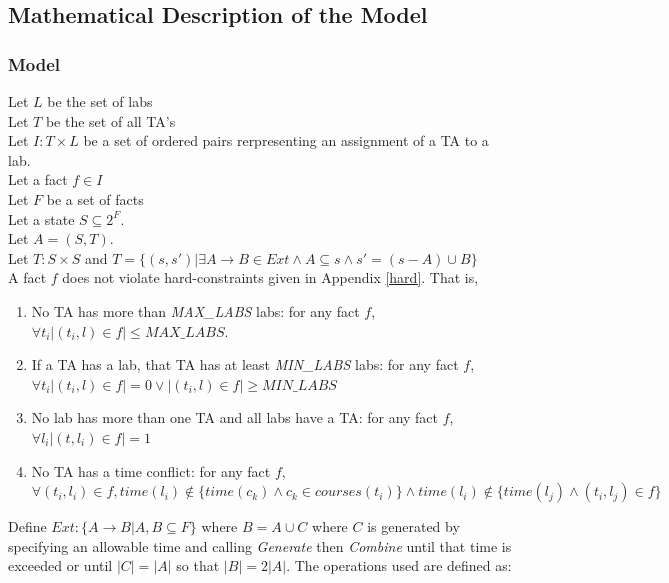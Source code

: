 \documentclass{article}
\begin{document}
\subsection{Mathematical Description of the Model}

\subsubsection{Model}

Let $L$ be the set of labs\\

Let $T$ be the set of all TA's\\

Let $I : T \times L$ be a set of ordered pairs rerpresenting an
assignment of a TA to a lab.\\

Let a fact $f \in I$\\

Let $F$ be a set of facts\\

Let a state $S \subseteq 2^F$.\\

Let $A = (S, T)$.\\

Let $T: S \times S$ and $T = \{ (s,s')| \exists A \to B \in Ext \land A
\subseteq s \land s' =(s-A) \cup B \}$ \\

A fact $f$ does not violate hard-constraints given in Appendix \ref{hard}. That is,
\begin{enumerate}
\item No TA has more than \textit{MAX\_LABS} labs: for any fact $f$, $\forall t_i |(t_i,l)\in f|\le MAX\_LABS$.
\item If a TA has a lab, that TA has at least \textit{MIN\_LABS} labs: for any fact $f$, $\forall t_i |(t_i,l)\in f|= 0 \lor |(t_i,l)\in f|\ge MIN\_LABS$
\item No lab has more than one TA and all labs have a TA: for any fact $f$, $\forall l_i |(t, l_i) \in f| = 1$
\item No TA has a time conflict: for any fact $f$, $\forall \left( t_i, l_i \right) \in f, time \left( l_i \right) \notin \lbrace time \left( c_k \right) \land c_k \in courses \left( t_i \right) \rbrace \land time(l_i) \notin \lbrace time(l_j) \land (t_i, l_j) \in f \rbrace $
\end{enumerate}

Define $Ext : \lbrace A \to B | A,B \subseteq F \rbrace$ where $B = A
\cup C$ where $C$ is generated by specifying an allowable time and
calling \textit{Generate} then \textit{Combine} until that time is
exceeded or until $|C| = |A|$ so that $|B| = 2|A|$. The operations
used are defined as:
\end{document}
